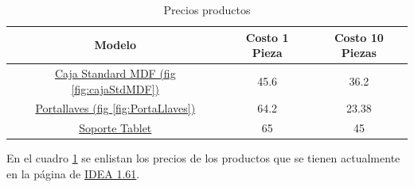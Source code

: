 \documentclass[]{article}
\begin{document}

\begin{table}[h!]
	\centering
	\begin{tabular}{|c|c|c|}
		\hline
		\textbf{Modelo}    & \textbf{Costo 1 Pieza} & \textbf{Costo 10 Piezas}      \\ \hline
		\href{https://idea161.org/producto/caja-mdf-personalizada/}{Caja Standard MDF (fig \ref{fig:cajaStdMDF})}  & 45.6 & 36.2 \\ \hline 
			\href{https://idea161.org/producto/porta-llaves-impreso-3d/}{Portallaves (fig \ref*{fig:PortaLlaves})}  & 64.2 & 23.38\\ \hline 
			\href{https://idea161.org/servicios/}{Soporte Tablet}  & 65  & 45 \\ \hline 
		
		
	\end{tabular}
	\caption{Precios productos}
	\label{precios}
\end{table}

En el cuadro \ref{precios} se enlistan los precios de los productos que se tienen actualmente en la página de 	\href{https://www.idea161.org}{IDEA 1.61}.\\



%
%
\end{document}
